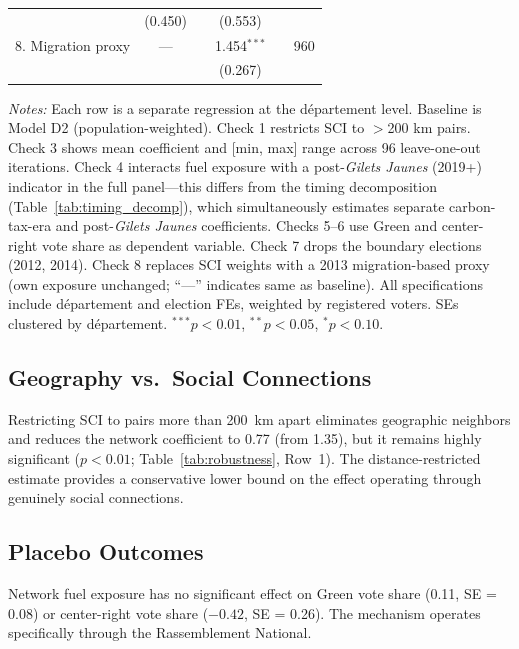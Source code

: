 \documentclass[12pt]{article}
\newcommand{\rn}{Rassemblement National}
\newcommand{\gj}{\textit{Gilets Jaunes}}
\newcommand{\dept}{d\'{e}partement}
\begin{document}
\begin{table}[H]
\begin{threeparttable}
\begin{tabular}{@{}lccccr@{}}
                     & (0.450) & & (0.553) & & \\[3pt]
8. Migration proxy    & --- & & 1.454$^{***}$ & & 960 \\
                     & & & (0.267) & & \\
\bottomrule
\end{tabular}
\begin{tablenotes}
\small
\item \textit{Notes:} Each row is a separate regression at the \dept{} level. Baseline is Model D2 (population-weighted). Check 1 restricts SCI to $>$200 km pairs. Check 3 shows mean coefficient and [min, max] range across 96 leave-one-out iterations. Check 4 interacts fuel exposure with a post-\gj{} (2019+) indicator in the full panel---this differs from the timing decomposition (Table~\ref{tab:timing_decomp}), which simultaneously estimates separate carbon-tax-era and post-\gj{} coefficients. Checks 5--6 use Green and center-right vote share as dependent variable. Check 7 drops the boundary elections (2012, 2014). Check 8 replaces SCI weights with a 2013 migration-based proxy (own exposure unchanged; ``---'' indicates same as baseline). All specifications include \dept{} and election FEs, weighted by registered voters. SEs clustered by \dept{}. $^{***}p<0.01$, $^{**}p<0.05$, $^{*}p<0.10$.
\end{tablenotes}
\end{threeparttable}
\end{table}

\subsection{Geography vs.\ Social Connections}

Restricting SCI to pairs more than 200~km apart eliminates geographic neighbors and reduces the network coefficient to 0.77 (from 1.35), but it remains highly significant ($p < 0.01$; Table~\ref{tab:robustness}, Row~1). The distance-restricted estimate provides a conservative lower bound on the effect operating through genuinely social connections.

\subsection{Placebo Outcomes}

Network fuel exposure has no significant effect on Green vote share (0.11, SE = 0.08) or center-right vote share ($-0.42$, SE = 0.26). The mechanism operates specifically through the \rn{}.
\end{document}
